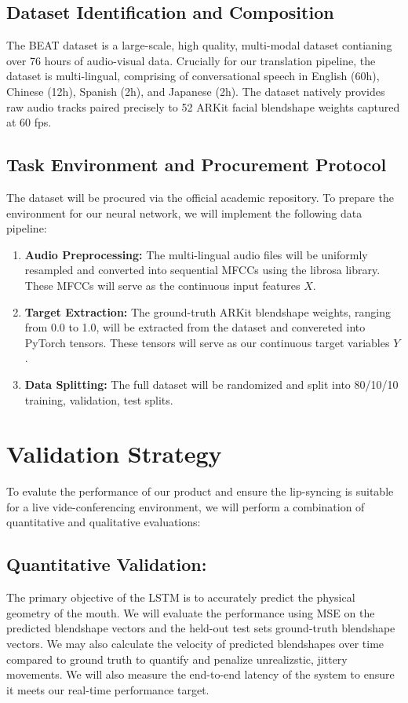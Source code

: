 \subsection{Dataset Identification and Composition}
The BEAT dataset is a large-scale, high quality, multi-modal dataset contianing over 76 hours of audio-visual data. Crucially for our translation pipeline, the dataset is multi-lingual, comprising of conversational speech in English (60h), Chinese (12h), Spanish (2h), and Japanese (2h). The dataset natively provides raw audio tracks paired precisely to 52 ARKit facial blendshape weights captured at 60 fps. 
\subsection{Task Environment and Procurement Protocol}
The dataset will be procured via the official academic repository. To prepare the environment for our neural network, we will implement the following data pipeline:
\begin{enumerate}
    \item \textbf{Audio Preprocessing:} The multi-lingual audio files will be uniformly resampled and converted into sequential MFCCs using the librosa library. These MFCCs will serve as the continuous input features $X$. 
    \item \textbf{Target Extraction:} The ground-truth ARKit blendshape weights, ranging from 0.0 to 1.0, will be extracted from the dataset and convereted into PyTorch tensors. These tensors will serve as our continuous target variables $Y$. 
    \item \textbf{Data Splitting:} The full dataset will be randomized and split into 80/10/10 training, validation, test splits.
\end{enumerate} 

\section{Validation Strategy}

To evalute the performance of our product and ensure the lip-syncing is suitable for a live vide-conferencing environment, we will perform a combination of quantitative and qualitative evaluations:
\subsection{Quantitative Validation:} The primary objective of the LSTM is to accurately predict the physical geometry of the mouth. We will evaluate the performance using MSE on the predicted blendshape vectors and the held-out test sets ground-truth blendshape vectors. We may also calculate the velocity of predicted blendshapes over time compared to ground truth to quantify and penalize unrealizstic, jittery movements. We will also measure the end-to-end latency of the system to ensure it meets our real-time performance target.
